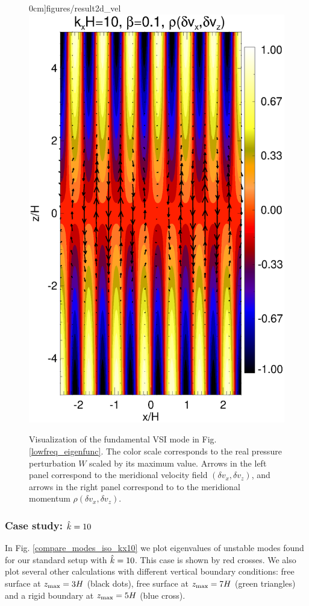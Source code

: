 \begin{figure}
  0cm]{figures/result2d_vel}\includegraphics[scale=0.345,clip=true,trim=1.9cm 0cm 0cm
  0cm]{figures/result2d_mom} 
  \caption{Visualization of the fundamental VSI mode in
    Fig. \ref{lowfreq_eigenfunc}. The color scale corresponds to the
    real pressure perturbation $W$ scaled by its maximum value.
    Arrows in the left panel correspond to the meridional velocity
    field $(\delta v_x,\delta v_z)$, and arrows in the right panel
    correspond to to the meridional momentum $\rho(\delta v_x,\delta
    v_z)$. 
    \label{lowfreq_eigenfunc_2d}
  }
\end{figure}


\subsubsection{Case study: $\hat{k}=10$}
In Fig. \ref{compare_modes_iso_kx10} we plot eigenvalues of unstable
modes found for our standard setup with $\hat{k}=10$. This case is shown
by red crosses. We also plot several other calculations with different
vertical boundary conditions: free surface at $z_\mathrm{max} = 3H$ (black
dots), free surface at $z_\mathrm{max}=7H$ (green triangles) and a rigid
boundary at $z_\mathrm{max}=5H$ (blue cross).   

